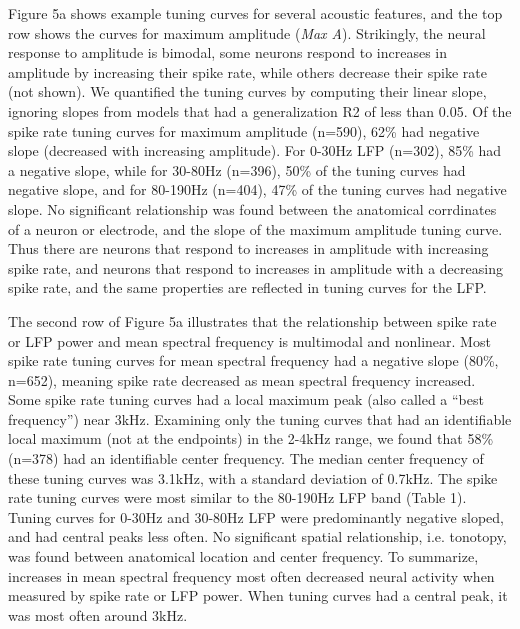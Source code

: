 Figure 5a shows example tuning curves for several acoustic features, and the top row shows the curves for maximum amplitude ({\em Max A}). Strikingly, the neural response to amplitude is bimodal, some neurons respond to increases in amplitude by increasing their spike rate, while others decrease their spike rate (not shown). We quantified the tuning curves by computing their linear slope, ignoring slopes from models that had a generalization R2 of less than 0.05. Of the spike rate tuning curves for maximum amplitude (n=590), 62\% had negative slope (decreased with increasing amplitude). For 0-30Hz LFP (n=302), 85\% had a negative slope, while for 30-80Hz (n=396), 50\% of the tuning curves had negative slope, and for 80-190Hz (n=404), 47\% of the tuning curves had negative slope. No significant relationship was found between the anatomical corrdinates of a neuron or electrode, and the slope of the maximum amplitude tuning curve. Thus there are neurons that respond to increases in amplitude with increasing spike rate, and neurons that respond to increases in amplitude with a decreasing spike rate, and the same properties are reflected in tuning curves for the LFP.

The second row of Figure 5a illustrates that the relationship between spike rate or LFP power and mean spectral frequency is multimodal and nonlinear. Most spike rate tuning curves for mean spectral frequency had a negative slope (80\%, n=652), meaning spike rate decreased as mean spectral frequency increased. Some spike rate tuning curves had a local maximum peak (also called a “best frequency”) near 3kHz. Examining only the tuning curves that had an identifiable local maximum (not at the endpoints) in the 2-4kHz range, we found that 58\% (n=378) had an identifiable center frequency. The median center frequency of these tuning curves was 3.1kHz, with a standard deviation of 0.7kHz. The spike rate tuning curves were most similar to the 80-190Hz LFP band (Table 1). Tuning curves for 0-30Hz and 30-80Hz LFP were predominantly negative sloped, and had central peaks less often. No significant spatial relationship, i.e. tonotopy, was found between anatomical location and center frequency. To summarize, increases in mean spectral frequency most often decreased neural activity when measured by spike rate or LFP power. When tuning curves had a central peak, it was most often around 3kHz.

